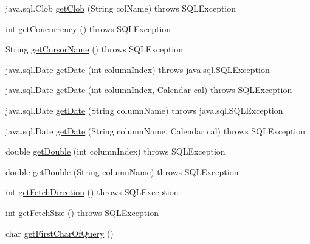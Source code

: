 \begin{DoxyCompactItemize}
\item 
java.\+sql.\+Clob \mbox{\hyperlink{classcom_1_1mysql_1_1jdbc_1_1_result_set_impl_a69deb5487ef64b397460ff4fdea4c13d}{get\+Clob}} (String col\+Name)  throws S\+Q\+L\+Exception 
\item 
int \mbox{\hyperlink{classcom_1_1mysql_1_1jdbc_1_1_result_set_impl_ad09f056bbe0879d38d3f57b999083fb5}{get\+Concurrency}} ()  throws S\+Q\+L\+Exception 
\item 
String \mbox{\hyperlink{classcom_1_1mysql_1_1jdbc_1_1_result_set_impl_a89ff94442cf6ac6f5b9cc9fc1be1d8ed}{get\+Cursor\+Name}} ()  throws S\+Q\+L\+Exception 
\item 
java.\+sql.\+Date \mbox{\hyperlink{classcom_1_1mysql_1_1jdbc_1_1_result_set_impl_a2ca574ddd1dfa28378d0aa9a85cb6b62}{get\+Date}} (int column\+Index)  throws java.\+sql.\+S\+Q\+L\+Exception 
\item 
java.\+sql.\+Date \mbox{\hyperlink{classcom_1_1mysql_1_1jdbc_1_1_result_set_impl_a6d094674b92d6f3084cd92d63c8ff356}{get\+Date}} (int column\+Index, Calendar cal)  throws S\+Q\+L\+Exception 
\item 
java.\+sql.\+Date \mbox{\hyperlink{classcom_1_1mysql_1_1jdbc_1_1_result_set_impl_a288cad7ec14f83f34a5b9b5d927e17f6}{get\+Date}} (String column\+Name)  throws java.\+sql.\+S\+Q\+L\+Exception 
\item 
java.\+sql.\+Date \mbox{\hyperlink{classcom_1_1mysql_1_1jdbc_1_1_result_set_impl_a0a7bdd217b0d581c313231156b7ec2be}{get\+Date}} (String column\+Name, Calendar cal)  throws S\+Q\+L\+Exception 
\item 
double \mbox{\hyperlink{classcom_1_1mysql_1_1jdbc_1_1_result_set_impl_a87d7b2fe049365eabfe54dc800b68ec0}{get\+Double}} (int column\+Index)  throws S\+Q\+L\+Exception 
\item 
double \mbox{\hyperlink{classcom_1_1mysql_1_1jdbc_1_1_result_set_impl_a301509f3aef1860590c3e7ee656d5142}{get\+Double}} (String column\+Name)  throws S\+Q\+L\+Exception 
\item 
int \mbox{\hyperlink{classcom_1_1mysql_1_1jdbc_1_1_result_set_impl_a67b150f3cdb700ccb176c37b732cab17}{get\+Fetch\+Direction}} ()  throws S\+Q\+L\+Exception 
\item 
int \mbox{\hyperlink{classcom_1_1mysql_1_1jdbc_1_1_result_set_impl_a9ae5eab29975fd26c16dbbb802465632}{get\+Fetch\+Size}} ()  throws S\+Q\+L\+Exception 
\item 
char \mbox{\hyperlink{classcom_1_1mysql_1_1jdbc_1_1_result_set_impl_a89ddba59e7cbed718934f80f443f69f8}{get\+First\+Char\+Of\+Query}} ()
\item 

\end{DoxyCompactItemize}
